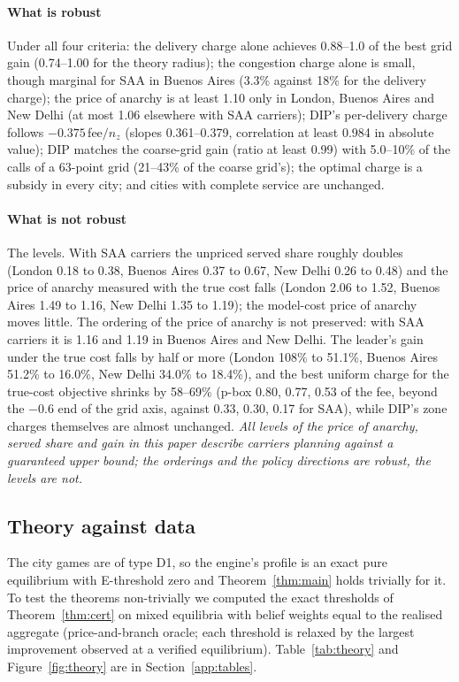 \documentclass[preprint,11pt]{elsarticle}
\theoremstyle{definition}
\theoremstyle{remark}
\begin{document}
\paragraph{What is robust} Under all four criteria: the delivery charge alone achieves 0.88--1.0 of the best grid gain (0.74--1.00 for the theory radius); the congestion charge alone is small, though marginal for SAA in Buenos Aires (3.3\% against 18\% for the delivery charge); the price of anarchy is at least 1.10 only in London, Buenos Aires and New Delhi (at most 1.06 elsewhere with SAA carriers); DIP's per-delivery charge follows $-0.375\,$fee$/n_z$ (slopes 0.361--0.379, correlation at least 0.984 in absolute value); DIP matches the coarse-grid gain (ratio at least 0.99) with 5.0--10\% of the calls of a 63-point grid (21--43\% of the coarse grid's); the optimal charge is a subsidy in every city; and cities with complete service are unchanged.

\paragraph{What is not robust} The levels. With SAA carriers the unpriced served share roughly doubles (London 0.18 to 0.38, Buenos Aires 0.37 to 0.67, New Delhi 0.26 to 0.48) and the price of anarchy measured with the true cost falls (London 2.06 to 1.52, Buenos Aires 1.49 to 1.16, New Delhi 1.35 to 1.19); the model-cost price of anarchy moves little. The ordering of the price of anarchy is not preserved: with SAA carriers it is 1.16 and 1.19 in Buenos Aires and New Delhi. The leader's gain under the true cost falls by half or more (London 108\% to 51.1\%, Buenos Aires 51.2\% to 16.0\%, New Delhi 34.0\% to 18.4\%), and the best uniform charge for the true-cost objective shrinks by 58--69\% (p-box 0.80, 0.77, 0.53 of the fee, beyond the $-0.6$ end of the grid axis, against 0.33, 0.30, 0.17 for SAA), while DIP's zone charges themselves are almost unchanged. \emph{All levels of the price of anarchy, served share and gain in this paper describe carriers planning against a guaranteed upper bound; the orderings and the policy directions are robust, the levels are not.}

\subsection{Theory against data}\label{sec:res-theory}

The city games are of type D1, so the engine's profile is an exact pure equilibrium with E-threshold zero and Theorem~\ref{thm:main} holds trivially for it. To test the theorems non-trivially we computed the exact thresholds of Theorem~\ref{thm:cert} on mixed equilibria with belief weights equal to the realised aggregate (price-and-branch oracle; each threshold is relaxed by the largest improvement observed at a verified equilibrium). Table~\ref{tab:theory} and Figure~\ref{fig:theory} are in Section~\ref{app:tables}.
\end{document}
